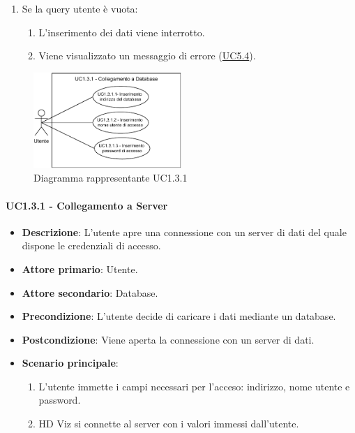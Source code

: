 \begin{itemize}
\begin{enumerate}
        \item Se la query utente è vuota:
        \begin{enumerate}
            \item L'inserimento dei dati viene interrotto.
            \item Viene visualizzato un messaggio di errore (\hyperref[ssub:uc5.4]{UC5.4}).
        \end{enumerate}
    \end{enumerate}
\end{itemize}


\newpage
\begin{figure}[h]
    \centering
    \includegraphics[width=0.5\textwidth]{componenti/casi-duso/diagrammi/UC1_3_1.pdf}
    \caption{Diagramma rappresentante UC1.3.1}
    \label{fig:UC1.3}
\end{figure}


\paragraph{UC1.3.1 - Collegamento a Server}
\label{par:uc1.3.1}
\begin{itemize}
    \item \textbf{Descrizione}: L'utente apre una connessione con un server di dati del quale 
                                dispone le credenziali di accesso. 

    \item \textbf{Attore primario}: Utente.
    \item \textbf{Attore secondario}: Database.
    
    \item \textbf{Precondizione}:   L'utente decide di caricare i dati mediante un database.
    \item \textbf{Postcondizione}:  Viene aperta la connessione con un server di dati.

	\item \textbf{Scenario principale}:
		\begin{enumerate}
			\item L'utente immette i campi necessari per l'acceso: indirizzo, nome utente e password.
			\item HD Viz si connette al server con i valori immessi dall'utente.
        \end{enumerate}
    \end{itemize}


